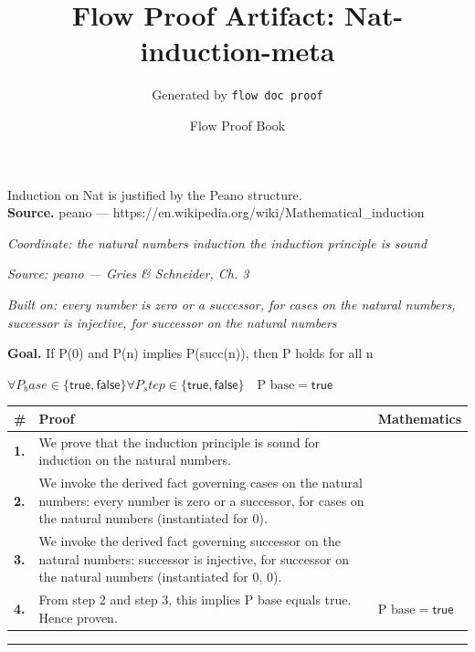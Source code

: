\documentclass[11pt]{article}
\title{Flow Proof Artifact: Nat-induction-meta}
\author{Generated by \texttt{flow doc proof}}
\date{Flow Proof Book}
\theoremstyle{definition}
\begin{document}
\maketitle
Induction on Nat is justified by the Peano structure.\\[0.5em]
\textbf{Source.} peano — https://en.wikipedia.org/wiki/Mathematical\_induction\\[0.5em]
\bigskip
{}\par
\smallskip\noindent\textit{Coordinate: the natural numbers \cdot induction \cdot the induction principle is sound}\par
\smallskip\noindent\textit{Source: peano — Gries \& Schneider, Ch. 3}\par
\smallskip\noindent\textit{Built on: every number is zero or a successor, for cases on the natural numbers, successor is injective, for successor on the natural numbers}\par
\medskip
\noindent\textbf{Goal.} If P(0) and P(n) implies P(succ(n)), then P holds for all n\par
\noindent$\displaystyle \forall P_base \in \{\mathsf{true}, \mathsf{false}\} \forall P_step \in \{\mathsf{true}, \mathsf{false}\}\quad \text{P base} = \mathsf{true}$\par
\medskip
\noindent
\begin{tabular}{@{} >{\raggedright\arraybackslash}p{} >{\raggedright\arraybackslash}p{} >{\raggedleft\arraybackslash}p{} @{}}
\textbf{\#} & \textbf{Proof} & \textbf{Mathematics} \\
\midrule
\textbf{1.} & We prove that the induction principle is sound for induction on the natural numbers. & \\[0.45em]
\textbf{2.} & We invoke the derived fact governing cases on the natural numbers: every number is zero or a successor, for cases on the natural numbers (instantiated for 0). & \\[0.45em]
\textbf{3.} & We invoke the derived fact governing successor on the natural numbers: successor is injective, for successor on the natural numbers (instantiated for 0, 0). & \\[0.45em]
\textbf{4.} & From step 2 and step 3, this implies P base equals true. Hence proven. & $\displaystyle \text{P base} = \mathsf{true}$ \\[0.45em]
\bottomrule
\end{tabular}
\label{thm:Nat-induction-the_induction_principle_is_sound}
\par\medskip\hrule
\end{document}
